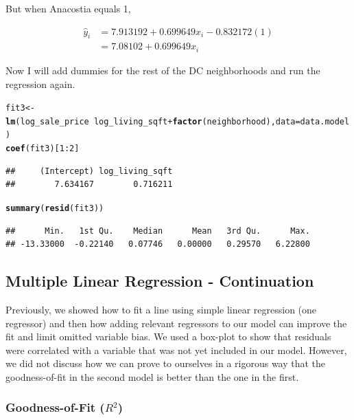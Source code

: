 \documentclass[10pt]{article}\usepackage[]{graphicx}\usepackage[]{color}
\makeatletter
\newcommand{\hlnum}[1]{\textcolor[rgb]{0.686,0.059,0.569}{#1}}%
\newcommand{\hlopt}[1]{\textcolor[rgb]{0,0,0}{#1}}%
\newcommand{\hlstd}[1]{\textcolor[rgb]{0.345,0.345,0.345}{#1}}%
\newcommand{\hlkwb}[1]{\textcolor[rgb]{0.69,0.353,0.396}{#1}}%
\newcommand{\hlkwc}[1]{\textcolor[rgb]{0.333,0.667,0.333}{#1}}%
\newcommand{\hlkwd}[1]{\textcolor[rgb]{0.737,0.353,0.396}{\textbf{#1}}}%
\newenvironment{kframe}{%
 \def\at@end@of@kframe{}%
 \ifinner\ifhmode%
  \def\at@end@of@kframe{\end{minipage}}%
  \begin{minipage}{\columnwidth}%
 \fi\fi%
 \def\FrameCommand##1{\hskip\@totalleftmargin \hskip-\fboxsep
 \colorbox{shadecolor}{##1}\hskip-\fboxsep
     \hskip-\linewidth \hskip-\@totalleftmargin \hskip\columnwidth}%
 \MakeFramed {\advance\hsize-\width
   \@totalleftmargin\z@ \linewidth\hsize
   \@setminipage}}%
 {\par\unskip\endMakeFramed%
 \at@end@of@kframe}
\newenvironment{knitrout}{}{} %
\makeatother
\begin{document}
But when Anacostia equals 1,

\begin{align*}
\hat{y}_i &= 7.913192 + 0.699649 x_i - 0.832172(1) \\
  &= 7.08102 + 0.699649 x_i
\end{align*}

Now I will add dummies for the rest of the DC neighborhoods and run the regression again.

\begin{knitrout}\small
{}\color{fgcolor}\begin{kframe}
\begin{alltt}
\hlstd{fit3}\hlkwb{<-}\hlkwd{lm}\hlstd{(log_sale_price} \hlopt{~} \hlstd{log_living_sqft} \hlopt{+} \hlkwd{factor}\hlstd{(neighborhood),}\hlkwc{data}\hlstd{=data.model)}
\hlkwd{coef}\hlstd{(fit3)[}\hlnum{1}\hlopt{:}\hlnum{2}\hlstd{]}
\end{alltt}
\begin{verbatim}
##     (Intercept) log_living_sqft 
##        7.634167        0.716211
\end{verbatim}
\begin{alltt}
\hlkwd{summary}\hlstd{(}\hlkwd{resid}\hlstd{(fit3))}
\end{alltt}
\begin{verbatim}
##      Min.   1st Qu.    Median      Mean   3rd Qu.      Max. 
## -13.33000  -0.22140   0.07746   0.00000   0.29570   6.22800
\end{verbatim}
\end{kframe}
\end{knitrout}

\subsection*{Multiple Linear Regression - Continuation }

Previously, we showed how to fit a line using simple linear regression (one regressor) and then how adding relevant regressors to our model can improve the fit and limit omitted variable bias. We used a box-plot to show that residuals were correlated with a variable that was not yet included in our model. However, we did not discuss how we can prove to ourselves in a rigorous way that the goodness-of-fit in the second model is better than the one in the first.

\subsubsection*{Goodness-of-Fit ($R^2$)}
\end{document}
